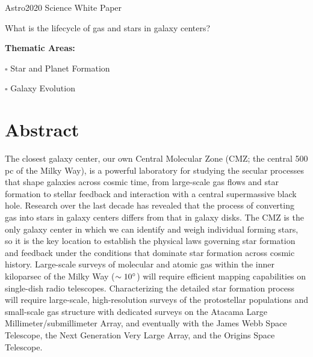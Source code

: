 \documentclass[modern]{aastex62}
\begin{document}

{\center
\huge
Astro2020 Science White Paper \linebreak

What is the lifecycle of gas and stars in galaxy centers? 
\vspace{5mm}
}

{
\noindent \textbf{Thematic Areas:}

\noindent $\square$ Star and Planet Formation 

\noindent $\square$ Galaxy Evolution  
}


\vspace{15mm}
\author{Adam Ginsburg}
\author{Elisabeth A.~C.~Mills}
\author{Cara D.~Battersby}
\author{Steven N.~Longmore}
\author{J.~M.~Diederik Kruijssen}




\vspace{-2.0cm}


\section*{Abstract}
\vspace{-1mm}
The closest galaxy center, our own Central Molecular Zone (CMZ; the
central 500 pc of the Milky Way), is a powerful laboratory for studying the
secular processes that shape galaxies across cosmic time, from large-scale gas flows
and star formation to stellar feedback and interaction with a central
supermassive black hole. Research over the last decade has revealed that the
process of converting gas into stars in galaxy centers differs from 
that in galaxy disks. The CMZ is the only galaxy center in which
we can identify and weigh individual forming stars, so it is the key location
to establish the physical laws governing star formation and feedback under the
conditions that dominate star formation across cosmic history. Large-scale surveys
of molecular and atomic gas within the inner kiloparsec of the Milky Way
($\sim10^{\circ}$) will require efficient mapping capabilities on single-dish
radio telescopes. Characterizing the detailed star formation process will
require large-scale, high-resolution surveys of the protostellar populations
and small-scale gas structure with dedicated surveys on the Atacama Large
Millimeter/submillimeter Array, and eventually with the James Webb Space
Telescope, the Next Generation Very Large Array, and the Origins Space
Telescope.
\vspace{7mm}
\end{document}
